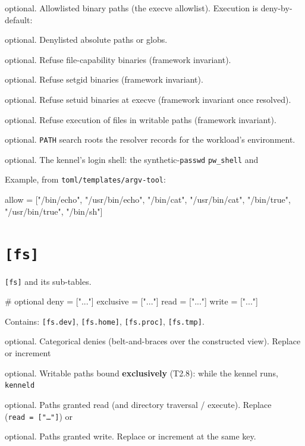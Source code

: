 \begin{description}
\tightlist
\item[\texttt{allow}]
optional. Allowlisted binary paths (the execve allowlist). Execution is
deny-by-default:
\item[\texttt{deny}]
optional. Denylisted absolute paths or globs.
\item[\texttt{deny\_setcap}]
optional. Refuse file-capability binaries (framework invariant).
\item[\texttt{deny\_setgid}]
optional. Refuse setgid binaries (framework invariant).
\item[\texttt{deny\_setuid}]
optional. Refuse setuid binaries at execve (framework invariant once
resolved).
\item[\texttt{deny\_writable}]
optional. Refuse execution of files in writable paths (framework
invariant).
\item[\texttt{path}]
optional. \texttt{PATH} search roots the resolver records for the
workload's environment.
\item[\texttt{shell}]
optional. The kennel's login shell: the synthetic-\texttt{passwd}
\texttt{pw\_shell} and
\end{description}

Example, from \texttt{toml/templates/argv-tool}:

\begin{kennelcode}
[exec]
allow = ["/bin/echo", "/usr/bin/echo", "/bin/cat", "/usr/bin/cat", "/bin/true", "/usr/bin/true", "/bin/sh"]
\end{kennelcode}

\hypertarget{fs}{%
\section{\texorpdfstring{\texttt{{[}fs{]}}}{{[}fs{]}}}\label{fs}}

\texttt{{[}fs{]}} and its sub-tables.

\begin{kennelcode}
[fs]
# optional
deny     = ["..."]
exclusive = ["..."]
read     = ["..."]
write    = ["..."]
\end{kennelcode}

Contains: \texttt{{[}fs.dev{]}}, \texttt{{[}fs.home{]}},
\texttt{{[}fs.proc{]}}, \texttt{{[}fs.tmp{]}}.

\begin{description}
\tightlist
\item[\texttt{deny}]
optional. Categorical denies (belt-and-braces over the constructed
view). Replace or increment
\item[\texttt{exclusive}]
optional. Writable paths bound \textbf{exclusively} (T2.8): while the
kennel runs, \texttt{kenneld}
\item[\texttt{read}]
optional. Paths granted read (and directory traversal / execute).
Replace (\texttt{read\ =\ {[}"…"{]}}) or
\item[\texttt{write}]
optional. Paths granted write. Replace or increment at the same key.
\end{description}

